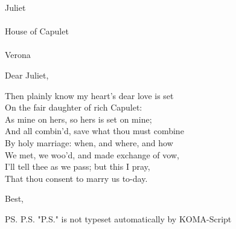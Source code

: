 \documentclass[foldmarks=false,refline=dateleft,fromrule=afteraddress,enlargefirstpage=on,fontsize=12pt,fromalign=center,subject=left,parskip=full]{scrlttr2}
\date{June  4, 2015.}
\begin{document}

\begin{letter}{%
Juliet \\\\
House of Capulet \\\\
Verona \\}

\opening{Dear Juliet,}


Then plainly know my heart's dear love is set \\
On the fair daughter of rich Capulet: \\
As mine on hers, so hers is set on mine; \\
And all combin'd, save what thou must combine \\
By holy marriage: when, and where, and how \\
We met, we woo'd, and made exchange of vow, \\
I'll tell thee as we pass; but this I pray, \\
That thou consent to marry us to-day. \\

\closing{Best,}

\ps{P.S. "P.S." is not typeset automatically by KOMA-Script \\}
\end{letter}

\end{document}
